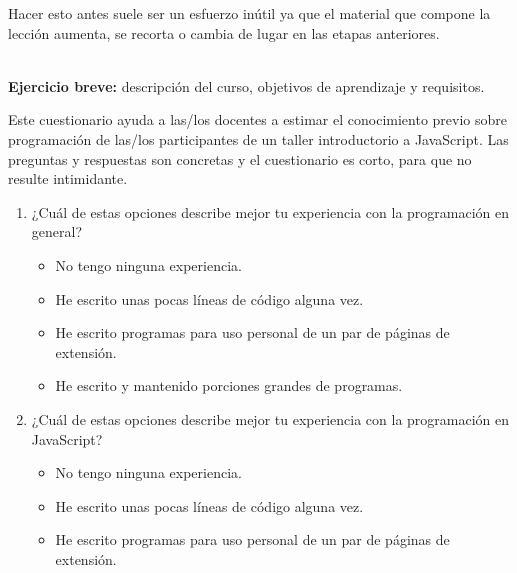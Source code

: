 Hacer esto antes suele ser un esfuerzo inútil
ya que el material que compone la lección aumenta, se recorta o cambia de lugar en las etapas anteriores.

~\\
\noindent
\textbf{Ejercicio breve:}
descripción del curso,
objetivos de aprendizaje
y requisitos.


Este cuestionario ayuda a las/los docentes a estimar el conocimiento previo sobre programación
de las/los participantes de un taller introductorio a JavaScript.
Las preguntas y respuestas son concretas
y el cuestionario es corto, para que no resulte intimidante.

\begin{enumerate}

\item
  ¿Cuál de estas opciones describe mejor
  tu experiencia con la programación en general?

  \begin{itemize}
    
  \item
    No tengo ninguna experiencia.
    
  \item
    He escrito unas pocas líneas de código alguna vez.
    
  \item
    He escrito programas para uso personal de un par de páginas de extensión.
    
  \item
    He escrito y mantenido porciones grandes de programas.\\
    
  \end{itemize}

\item
  ¿Cuál de estas opciones describe mejor
  tu experiencia con la programación en JavaScript?

  \begin{itemize}
    
  \item
    No tengo ninguna experiencia.
    
  \item
    He escrito unas pocas líneas de código alguna vez.
    
  \item
    He escrito programas para uso personal de un par de páginas de extensión.
    

\end{itemize}
\end{enumerate}
